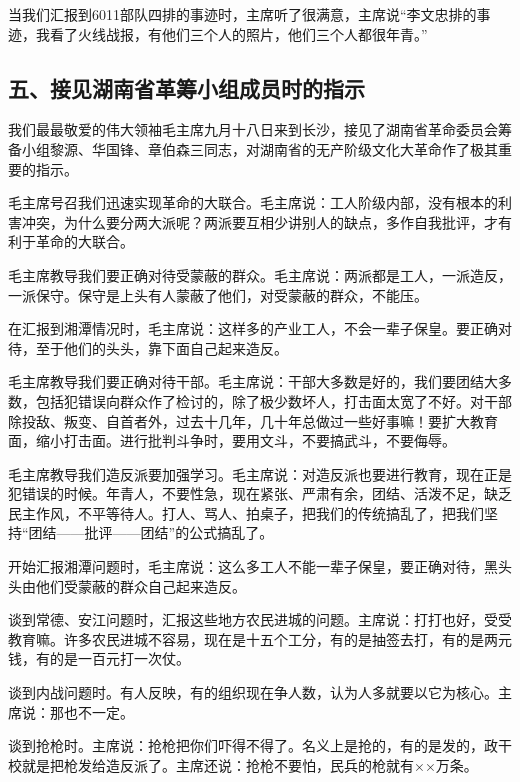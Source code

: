 {当我们汇报到6011部队四排的事迹时，主席听了很满意，主席说“李文忠排的事迹，我看了火线战报，有他们三个人的照片，他们三个人都很年青。”


\subsection{五、接见湖南省革筹小组成员时的指示}

我们最最敬爱的伟大领袖毛主席九月十八日来到长沙，接见了湖南省革命委员会筹备小组黎源、华国锋、章伯森三同志，对湖南省的无产阶级文化大革命作了极其重要的指示。

毛主席号召我们迅速实现革命的大联合。毛主席说：工人阶级内部，没有根本的利害冲突，为什么要分两大派呢？两派要互相少讲别人的缺点，多作自我批评，才有利于革命的大联合。

毛主席教导我们要正确对待受蒙蔽的群众。毛主席说：两派都是工人，一派造反，一派保守。保守是上头有人蒙蔽了他们，对受蒙蔽的群众，不能压。

在汇报到湘潭情况时，毛主席说：这样多的产业工人，不会一辈子保皇。要正确对待，至于他们的头头，靠下面自己起来造反。

毛主席教导我们要正确对待干部。毛主席说：干部大多数是好的，我们要团结大多数，包括犯错误向群众作了检讨的，除了极少数坏人，打击面太宽了不好。对干部除投敌、叛变、自首者外，过去十几年，几十年总做过一些好事嘛！要扩大教育面，缩小打击面。进行批判斗争时，要用文斗，不要搞武斗，不要侮辱。

毛主席教导我们造反派要加强学习。毛主席说：对造反派也要进行教育，现在正是犯错误的时候。年青人，不要性急，现在紧张、严肃有余，团结、活泼不足，缺乏民主作风，不平等待人。打人、骂人、拍桌子，把我们的传统搞乱了，把我们坚持“团结——批评——团结”的公式搞乱了。


开始汇报湘潭问题时，毛主席说：这么多工人不能一辈子保皇，要正确对待，黑头头由他们受蒙蔽的群众自己起来造反。

谈到常德、安江问题时，汇报这些地方农民进城的问题。主席说：打打也好，受受教育嘛。许多农民进城不容易，现在是十五个工分，有的是抽签去打，有的是两元钱，有的是一百元打一次仗。

谈到内战问题时。有人反映，有的组织现在争人数，认为人多就要以它为核心。主席说：那也不一定。

谈到抢枪时。主席说：抢枪把你们吓得不得了。名义上是抢的，有的是发的，政干校就是把枪发给造反派了。主席还说：抢枪不要怕，民兵的枪就有××万条。

}
